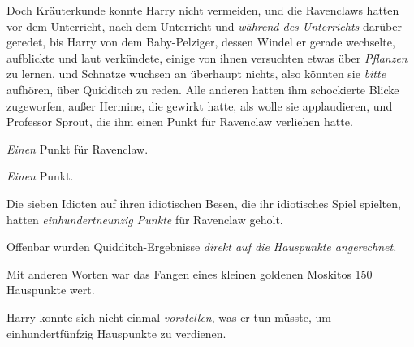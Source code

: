 Doch Kräuterkunde konnte Harry nicht vermeiden, und die Ravenclaws hatten vor dem Unterricht, nach dem Unterricht und \emph{während des Unterrichts} darüber geredet, bis Harry von dem Baby-Pelziger, dessen Windel er gerade wechselte, aufblickte und laut verkündete, einige von ihnen versuchten etwas über \emph{Pflanzen} zu lernen, und Schnatze wuchsen an überhaupt nichts, also könnten sie \emph{bitte} aufhören, über Quidditch zu reden. Alle anderen hatten ihm schockierte Blicke zugeworfen, außer Hermine, die gewirkt hatte, als wolle sie applaudieren, und Professor Sprout, die ihm einen Punkt für Ravenclaw verliehen hatte.%

\emph{Einen} Punkt für Ravenclaw.

\emph{Einen} Punkt.

Die sieben Idioten auf ihren idiotischen Besen, die ihr idiotisches Spiel spielten, hatten \emph{einhundertneunzig Punkte} für Ravenclaw geholt.

Offenbar wurden Quidditch-Ergebnisse \emph{direkt auf die Hauspunkte angerechnet.}

Mit anderen Worten war das Fangen eines kleinen goldenen Moskitos 150 Hauspunkte wert.

Harry konnte sich nicht einmal \emph{vorstellen}, was er tun müsste, um einhundertfünfzig Hauspunkte zu verdienen.

